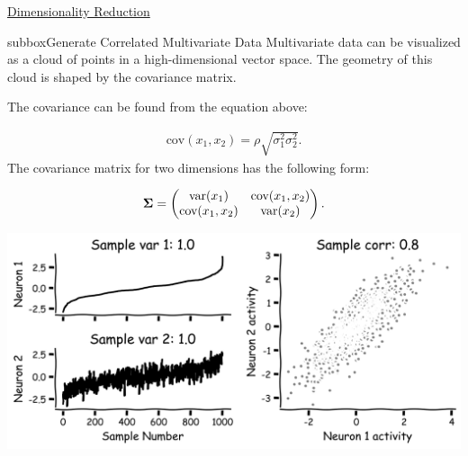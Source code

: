 \let\clearpage\relax

\begin{textbox}{\href{https://compneuro.neuromatch.io/tutorials/W1D4_DimensionalityReduction/student/W1D4_Tutorial1.html}{Dimensionality Reduction } }
\begin{subbox}{subbox}{Generate Correlated Multivariate Data}
\scriptsize
 Multivariate data can be visualized as a cloud of points in a high-dimensional vector space. The geometry of this cloud is shaped by the covariance matrix.

The covariance can be found from the equation above:

\begin{align}
\text{cov}(x_1,x_2) = \rho \sqrt{\sigma_1^2 \sigma_2^2}.
\end{align}
The covariance matrix for two dimensions has the following form:

\begin{align}
{\bf \Sigma} = 
\begin{pmatrix}
 \text{var}(x_1) & \text{cov}(x_1,x_2) \\
 \text{cov}(x_1,x_2) &\text{var}(x_2)
\end{pmatrix}.
\end{align}

\centering
\includegraphics[scale=0.15]{Figures/DM/DMFigure1.png}
\end{subbox}


\end{textbox}
